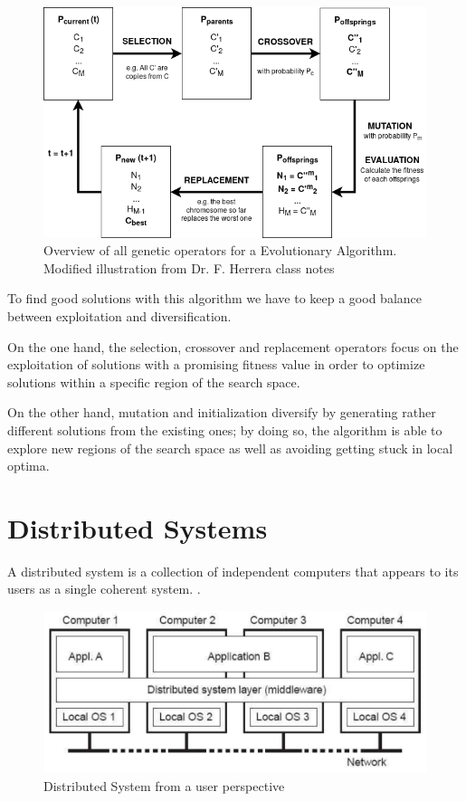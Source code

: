 \begin{figure}[h!]
\centering
    \includegraphics[width=\linewidth]{assets/images/EA_diagram.png}
    \caption{Overview of all genetic operators for a Evolutionary Algorithm. Modified illustration from Dr. F. Herrera  class notes}
    \label{fig:EA_diagram}
\end{figure}

To find good solutions with this algorithm we have to keep a good balance between exploitation and diversification. 

On the one hand, the selection, crossover and replacement operators focus on the exploitation of solutions with a promising fitness value in order to optimize solutions within a specific region of the search space. 

On the other hand, mutation and initialization diversify by generating rather different solutions from the existing ones; by doing so, the algorithm is able to explore new regions of the search space as well as avoiding getting stuck in local optima.

\section{Distributed Systems}
A distributed system is a collection of independent computers that appears to its users as a single coherent system. \cite{dissis_def}.

\begin{figure}[h!]
\centering
    \includegraphics[scale=0.3]{assets/images/distributed-system_diagram.png}
    \caption{Distributed System from a user perspective}
    \label{fig:distributed_system}
\end{figure}

